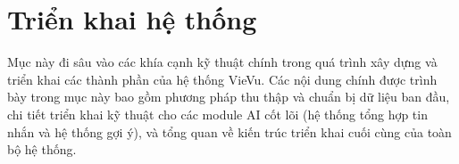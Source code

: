 \section{Triển khai hệ thống}
Mục này đi sâu vào các khía cạnh kỹ thuật chính trong quá trình xây dựng và triển khai các thành phần của hệ thống VieVu. Các nội dung chính được trình bày trong mục này bao gồm phương pháp thu thập và chuẩn bị dữ liệu ban đầu, chi tiết triển khai kỹ thuật cho các module AI cốt lõi (hệ thống tổng hợp tin nhắn và hệ thống gợi ý), và tổng quan về kiến trúc triển khai cuối cùng của toàn bộ hệ thống.

% 

% 









